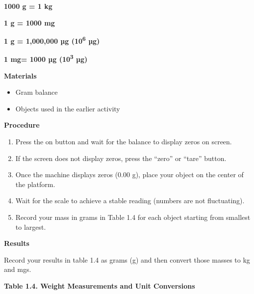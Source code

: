\documentclass[
  letterpaper,
  DIV=11,
  numbers=noendperiod]{scrreprt}
\begin{document}
\textbf{1000 g = 1 kg}

\textbf{1 g = 1000 mg}

\textbf{1 g = 1,000,000 µg (10\textsuperscript{6} µg)}

\textbf{1 mg= 1000 µg (10\textsuperscript{3} µg)}

\textbf{Materials}

\begin{itemize}
\item
  Gram balance
\item
  Objects used in the earlier activity
\end{itemize}

\textbf{Procedure}

\begin{enumerate}
\def\labelenumi{\arabic{enumi}.}
\item
  Press the on button and wait for the balance to display zeros on
  screen.
\item
  If the screen does not display zeros, press the ``zero'' or ``tare''
  button.
\item
  Once the machine displays zeros (0.00 g), place your object on the
  center of the platform.
\item
  Wait for the scale to achieve a stable reading (numbers are not
  fluctuating).
\item
  Record your mass in grams in Table 1.4 for each object starting from
  smallest to largest.
\end{enumerate}

\textbf{Results}

Record your results in table 1.4 as grams (g) and then convert those
masses to kg and mgs.

\textbf{Table 1.4. Weight Measurements and Unit Conversions}
\end{document}
